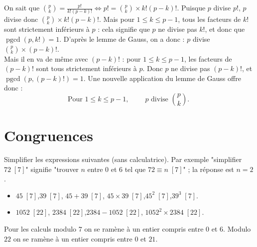 \documentclass[11pt,class=report,crop=false]{standalone}
\newcommand{\pgcd}{\mathop{\mathrm{pgcd}}\nolimits}
\begin{document}
\bigskip

On sait que $\binom{p}{k} = \frac{p!}{k!(p-k)!} \iff p! = \binom{p}{k} \times k! (p-k)!$. Puisque $p$ divise $p!$, $p$ divise donc $\binom{p}{k} \times k! (p-k)!$. Mais pour $1 \leq k \leq p-1$, tous les facteurs de $k!$ sont strictement inférieurs à $p$ : cela signifie que $p$ ne divise pas $k!$, et donc que $\pgcd(p,k!)=1$. D'après le lemme de Gauss, on a donc : $p$ divise $\binom{p}{k} \times (p-k)!$.\\
Mais il en va de même avec $(p-k)!$ : pour $1 \leq k \leq p-1$, les facteurs de $(p-k)!$ sont tous strictement inférieurs à $p$. Donc $p$ ne divise pas $(p-k)!$, et $\pgcd(p,(p-k)!) = 1$. Une nouvelle application du lemme de Gauss offre donc : 
$$ \boxed{\text{Pour } 1 \le k \le p-1,\qquad   \; p \text{ divise } \binom{p}{k}. \; }$$
\fincorrection
\finexercice



\section{Congruences}



\exercice{}

\enonce
Simplifier les expressions suivantes (sans calculatrice). Par exemple "simplifier $72 \; [7]$" signifie "trouver $n$ entre $0$ et $6$ tel que $72 \equiv n \; [7]$" ; la réponse est $n=2$.
\begin{itemize}
    \item $45 \; [7]$,\quad $39 \; [7]$, \quad $45+39 \; [7]$, \quad $45 \times 39 \; [7]$,\quad $45^2 \; [7]$,\quad  $39^3 \; [7]$.
    \item $1052 \; [22]$, \quad $2384 \; [22]$,\quad  $2384-1052 \; [22]$, \quad $1052^2 \times 2384 \; [22]$.
\end{itemize} 
\finenonce

\indication
Pour les calculs modulo $7$ on se ramène à un entier compris entre $0$ et $6$.
Modulo $22$ on se ramène à un entier compris entre $0$ et $21$.
\finindication
\end{document}

